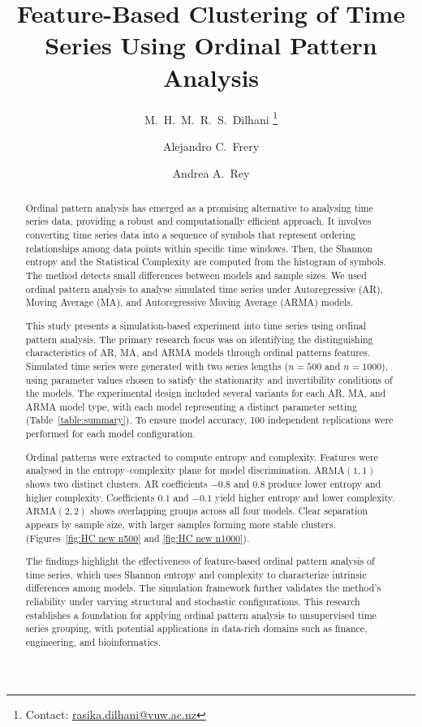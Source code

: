 \documentclass[11pt,a4paper]{article}
\title{\vspace{-1cm}Feature-Based Clustering of Time Series Using Ordinal Pattern Analysis\vspace{-0.3cm}}
\author[1]{M.\ H.\ M.\ R.\ S.\ Dilhani \thanks{Contact: \href{mailto:rasika.dilhani@vuw.ac.nz}{rasika.dilhani@vuw.ac.nz}}}
\author[1]{Alejandro C.\ Frery}
\author[2]{Andrea A.\ Rey}
\affil[1]{School of Mathematics and Statistics, Victoria University of Wellington, New Zealand}
\affil[2]{Laboratorio de Investigación y Desarrollo Experimental en Computación (LIDEC), Universidad Nacional de Hurlingham (UNAHUR), Argentina}
\date{}
\begin{document}
	\maketitle
	\vspace{-0.5cm}
	
	\begin{abstract}
	
	
Ordinal pattern analysis has emerged as a promising alternative to analysing time series data, providing a robust and computationally efficient approach. 
It involves converting time series data into a sequence of symbols that represent ordering relationships among data points within specific time windows.  
Then, the Shannon entropy and the Statistical Complexity are computed from the histogram of symbols. 
The method detects small differences between models and sample sizes.
We used ordinal pattern analysis to analyse simulated time series under Autoregressive (AR), Moving Average (MA), and Autoregressive Moving Average (ARMA) models. 
	
This study presents a simulation-based experiment into time series using ordinal pattern analysis. 
The primary research focus was on identifying the distinguishing characteristics of AR, MA, and ARMA models through ordinal patterns features. 
Simulated time series were generated with two series lengths ($n = 500$ and $n = 1000$), using parameter values chosen to satisfy the stationarity and invertibility conditions of the models. 
The experimental design included several variants for each AR, MA, and ARMA model type, with each model representing a distinct parameter setting (Table~\ref{table:summary}). 
To ensure model accuracy, 100 independent replications were performed for each model configuration.

Ordinal patterns were extracted to compute entropy and complexity. 
Features were analysed in the entropy–complexity plane for model discrimination. 
$\mathrm{ARMA}(1,1)$ shows two distinct clusters.
AR coefficients $-0.8$ and $0.8$ produce lower entropy and higher complexity. 
Coefficients $0.1$ and $-0.1$ yield higher entropy and lower complexity. 
$\mathrm{ARMA}(2,2)$ shows overlapping groups across all four models. 
Clear separation appears by sample size, with larger samples forming more stable clusters. (Figures~\ref{fig:HC new n500} and \ref{fig:HC new n1000}).

The findings highlight the effectiveness of feature-based ordinal pattern analysis of time series, which uses Shannon entropy and complexity to characterize intrinsic differences among models. 
The simulation framework further validates the method’s reliability under varying structural and stochastic configurations. 
This research establishes a foundation for applying ordinal pattern analysis to unsupervised time series grouping, with potential applications in data-rich domains such as finance, engineering, and bioinformatics.

\end{abstract}
\end{document}
